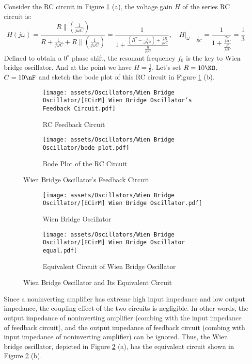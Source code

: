 \documentclass[D:/a_RemoteRepo/GH.LatexNotes/.demo/Analog_Circuits_Handbook.tex]{subfiles}
\begin{document}
Consider the RC circuit in Figure \ref{fig: Wien Bridge Oscillator Feedback Circuit} (a), the voltage gain $H$ of the series RC circuit is:
\begin{equation}
H(j\omega) = \frac{R \parallel (\frac{1}{j \omega C})}{R + \frac{1}{j \omega C} + R \parallel (\frac{1}{j \omega C})} = \frac{1}{1 + \frac{\left(R^2 - \frac{1}{\omega^2C^2}\right) + \frac{2R}{j \omega C}}{\frac{R}{j \omega C}}},\quad H|_{\omega = \frac{1}{RC}} = \frac{1}{1 + \frac{\frac{2R}{j \omega C}}{\frac{R}{j \omega C}}} = \frac{1}{3}
\end{equation}
Defined to obtain a $0^\circ$ phase shift, the resonant frequency $f_0$ is the key to Wien bridge oscillator. And at the point we have $H = \frac{1}{3}$. Let's set $R = 10 \KO$, $C = 10 \nF$ and sketch the bode plot of this RC circuit in Figure \ref{fig: Wien Bridge Oscillator Feedback Circuit} (b).

\begin{figure}[H]\centering
\begin{subfigure}[b]{0.47\columnwidth}\centering
    \texttt{[image: assets/Oscillators/Wien Bridge Oscillator/[ECirM] Wien Bridge Oscillator's Feedback Circuit.pdf]}
    \caption{RC Feedback Circuit}
\end{subfigure}\hfill
\begin{subfigure}[b]{0.53\columnwidth}\centering
    \texttt{[image: assets/Oscillators/Wien Bridge Oscillator/bode plot.pdf]}
    \caption{Bode Plot of the RC Circuit}
\end{subfigure}
\caption{Wien Bridge Oscillator's Feedback Circuit}
\label{fig: Wien Bridge Oscillator Feedback Circuit}
\end{figure}


\begin{figure}[H]\centering
\begin{subfigure}[b]{0.5\columnwidth}\centering
    \texttt{[image: assets/Oscillators/Wien Bridge Oscillator/[ECirM] Wien Bridge Oscillator.pdf]}
    \caption{Wien Bridge Oscillator}
\end{subfigure}\hfill
\begin{subfigure}[b]{0.5\columnwidth}\centering
    \texttt{[image: assets/Oscillators/Wien Bridge Oscillator/[ECirM] Wien Bridge Oscillator equal.pdf]}
    \caption{Equivalent Circuit of Wien Bridge Oscillator}
\end{subfigure}
\caption{Wien Bridge Oscillator and Its Equivalent Circuit}
\label{fig: Wien Bridge Oscillator}
\end{figure}
Since a noninverting amplifier has extreme high input impedance and low output impedance, the coupling effect of the two circuits is negligible. In other words, the output impedance of noninverting amplifier (combing with the input impedance of feedback circuit), and the output impedance of feedback circuit (combing with input impedance of noninverting amplifier) can be ignored. Thus, the Wien bridge oscillator, depicted in Figure \ref{fig: Wien Bridge Oscillator} (a), has the equivalent circuit shown in Figure \ref{fig: Wien Bridge Oscillator} (b). 
\end{document}
